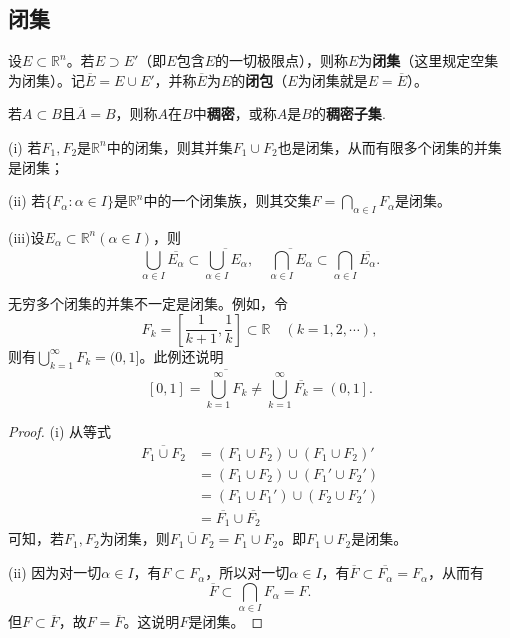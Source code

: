 \documentclass[lang=cn,newtx,10pt,scheme=chinese]{../Template/elegantbook}
\begin{document}
\subsection{闭集}

\begin{definition}[闭集与闭包]\label{definition:闭集与闭包}
设\(E\subset\mathbb{R}^n\)。若\(E\supset E'\)（即\(E\)包含\(E\)的一切极限点），则称\(E\)为\textbf{闭集}（这里规定空集为闭集）。记\(\overline{E}=E\cup E'\)，并称\(\overline{E}\)为\(E\)的\textbf{闭包}（\(E\)为闭集就是\(E = \overline{E}\)）。
\end{definition}

\begin{definition}[稠密子集]\label{definition:稠密子集}
  若\(A\subset B\)且\(\overline{A}=B\)，则称\(A\)在\(B\)中\textbf{稠密}，或称\(A\)是\(B\)的\textbf{稠密子集}.
\end{definition}

\begin{theorem}[闭集的运算性质]\label{theorem:闭集的运算性质}
  (i) 若\(F_1,F_2\)是\(\mathbb{R}^n\)中的闭集，则其并集\(F_1\cup F_2\)也是闭集，从而有限多个闭集的并集是闭集；

(ii) 若\(\{F_{\alpha}:\alpha\in I\}\)是\(\mathbb{R}^n\)中的一个闭集族，则其交集\(F = \bigcap_{\alpha\in I}F_{\alpha}\)是闭集。

(iii)设\(E_{\alpha}\subset\mathbb{R}^n(\alpha\in I)\)，则
\[\bigcup_{\alpha\in I}\overline{E_{\alpha}}\subset\overline{\bigcup_{\alpha\in I}E_{\alpha}},\quad\overline{\bigcap_{\alpha\in I}E_{\alpha}}\subset\bigcap_{\alpha\in I}\overline{E_{\alpha}}.\]
\end{theorem}
\begin{remark}
  无穷多个闭集的并集不一定是闭集。例如，令
\[F_k=\left[\frac{1}{k + 1},\frac{1}{k}\right]\subset\mathbb{R}\quad(k = 1,2,\cdots),\]
则有\(\bigcup_{k = 1}^{\infty}F_k=(0,1]\)。此例还说明
\[\left[ 0,1 \right] =\overline{\bigcup_{k=1}^{\infty}{F_k}}\ne \bigcup_{k=1}^{\infty}{\overline{F_k}}=\left( 0,1 \right] .\]
\end{remark}
\begin{proof}
  (i) 从等式
\begin{align*}
\overline{F_1\cup F_2}&=(F_1\cup F_2)\cup (F_1\cup F_2)'\\
&=(F_1\cup F_2)\cup (F_1'\cup F_2')\\
&=(F_1\cup F_1')\cup (F_2\cup F_2')\\
&=\overline{F_1}\cup\overline{F_2}
\end{align*}
可知，若\(F_1,F_2\)为闭集，则\(\overline{F_1\cup F_2}=F_1\cup F_2\)。即\(F_1\cup F_2\)是闭集。

(ii) 因为对一切\(\alpha\in I\)，有\(F\subset F_{\alpha}\)，所以对一切\(\alpha\in I\)，有\(\overline{F}\subset\overline{F_{\alpha}} = F_{\alpha}\)，从而有
\[\overline{F}\subset\bigcap_{\alpha\in I}F_{\alpha}=F.\]
但\(F\subset\overline{F}\)，故\(F=\overline{F}\)。这说明\(F\)是闭集。

\end{proof}
\end{document}
